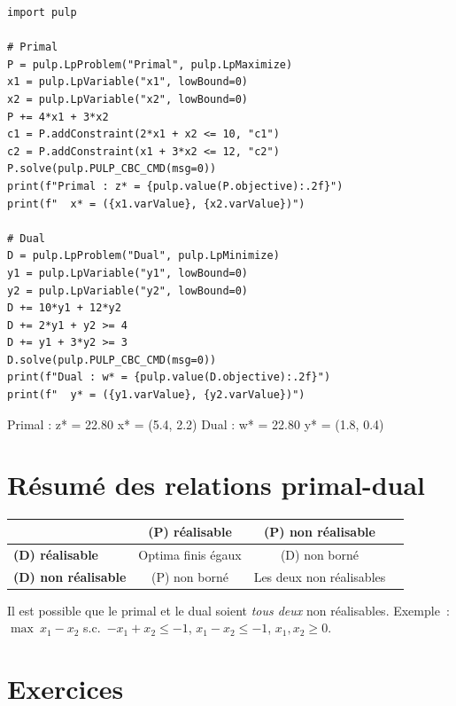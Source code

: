 \begin{codeblock}[title=\textbf{V\'erification avec PuLP}]
\begin{verbatim}
import pulp

# Primal
P = pulp.LpProblem("Primal", pulp.LpMaximize)
x1 = pulp.LpVariable("x1", lowBound=0)
x2 = pulp.LpVariable("x2", lowBound=0)
P += 4*x1 + 3*x2
c1 = P.addConstraint(2*x1 + x2 <= 10, "c1")
c2 = P.addConstraint(x1 + 3*x2 <= 12, "c2")
P.solve(pulp.PULP_CBC_CMD(msg=0))
print(f"Primal : z* = {pulp.value(P.objective):.2f}")
print(f"  x* = ({x1.varValue}, {x2.varValue})")

# Dual
D = pulp.LpProblem("Dual", pulp.LpMinimize)
y1 = pulp.LpVariable("y1", lowBound=0)
y2 = pulp.LpVariable("y2", lowBound=0)
D += 10*y1 + 12*y2
D += 2*y1 + y2 >= 4
D += y1 + 3*y2 >= 3
D.solve(pulp.PULP_CBC_CMD(msg=0))
print(f"Dual : w* = {pulp.value(D.objective):.2f}")
print(f"  y* = ({y1.varValue}, {y2.varValue})")
\end{verbatim}
\end{codeblock}

\begin{codeoutput}
Primal : z* = 22.80
  x* = (5.4, 2.2)
Dual : w* = 22.80
  y* = (1.8, 0.4)
\end{codeoutput}

\section{R\'esum\'e des relations primal-dual}

\begin{center}
\renewcommand{\arraystretch}{1.3}
\begin{tabular}{lccc}
  \toprule
  & \textbf{(P) r\'ealisable} & \textbf{(P) non r\'ealisable} \\
  \midrule
  \textbf{(D) r\'ealisable} & Optima finis \'egaux & (D) non born\'e \\
  \textbf{(D) non r\'ealisable} & (P) non born\'e & Les deux non r\'ealisables \\
  \bottomrule
\end{tabular}
\end{center}

\begin{remarque}
Il est possible que le primal et le dual soient \emph{tous deux} non
r\'ealisables.  Exemple~: $\max\ x_1 - x_2$ s.c.\ $-x_1 + x_2 \le -1$,
$x_1 - x_2 \le -1$, $x_1, x_2 \ge 0$.
\end{remarque}

\section{Exercices}


